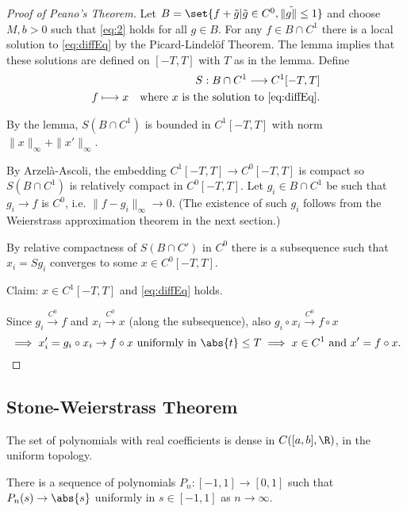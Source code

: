 \documentclass{article}
\begin{document}
\begin{proof}[Proof of Peano's Theorem]
    Let $B = \set{f + \tilde{g} | \tilde{g} \in C^0, \|\tilde{g\|} \leq 1}$ and choose $M, b > 0$ such that \eqref{eq:2} holds for all $g \in B$.
    For any $f \in B \cap C^1$ there is a local solution to \eqref{eq:diffEq} by the Picard-Lindel\"of Theorem.
    The lemma implies that these solutions are defined on $[-T,T]$ with $T$ as in the lemma.
    Define
    \begin{align*}
        S:B \cap C^1 \longrightarrow C^1[-T, T] \\
        f \longmapsto x \quad \text{where $x$ is the solution to \eqref{eq:diffEq}.}
    \end{align*}

    By the lemma, $S(B \cap C^1)$ is bounded in $C^1[-T, T]$ with norm $\|x\|_\infty + \|x'\|_\infty$.

    By Arzel\`a-Ascoli, the embedding $C^1[-T, T] \to C^0 [-T, T]$ is compact so $S(B \cap C^1)$ is relatively compact in $C^0[-T, T]$.
    Let $g_i \in B \cap C^1$ be such that $g_i \to f$ is $C^0$, i.e. $\|f - g_i\|_\infty \to 0$.
    (The existence of such $g_i$ follows from the Weierstrass approximation theorem in the next section.)

    By relative compactness of $S(B \cap C')$ in $C^0$ there is a subsequence such that $x_i = S g_i$ converges to some $x \in C^0[-T, T]$.

    Claim: $x \in C^1[-T, T]$ and \eqref{eq:diffEq} holds.

    Since $g_i \xrightarrow{C^0} f$ and $x_i \xrightarrow{C^0} x$ (along the subsequence), also $g_i \circ x_i \xrightarrow{C^0} f \circ x$
    \begin{equation*}
        \implies x_i' = g_i \circ x_i \to f \circ x \text{ uniformly in } \abs{t} \leq T \\
        \implies x \in C^1 \text{ and } x' = f \circ x.
    \end{equation*}
\end{proof}


\subsection{Stone-Weierstrass Theorem}

\begin{thm}
    The set of polynomials with real coefficients is dense in $C([a,b], \R)$, in the uniform topology.
\end{thm}
\begin{lemma}
    There is a sequence of polynomials $P_n:[-1, 1] \to [0, 1]$ such that $P_n(s) \to \abs{s}$ uniformly in $s \in [-1, 1]$ as $n \to \infty$.
\end{lemma}
\end{document}
